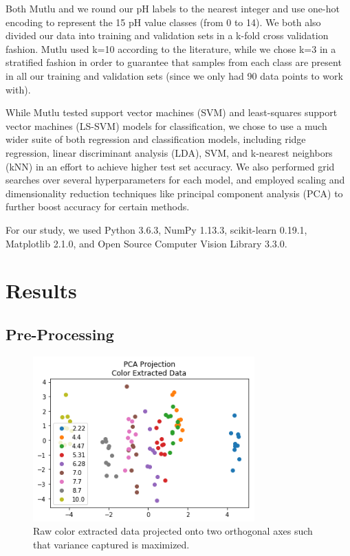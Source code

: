 \documentclass[journal]{IEEEtran}
\begin{document}
Both Mutlu and we round our pH labels to the nearest integer and use one-hot encoding to represent the 15 pH value classes (from 0 to 14). We both also divided our data into training and validation sets in a k-fold cross validation fashion. Mutlu used k=10 according to the literature, while we chose k=3 in a stratified fashion in order to guarantee that samples from each class are present in all our training and validation sets (since we only had 90 data points to work with).

While Mutlu tested support vector machines (SVM) and least-squares support vector machines (LS-SVM) models for classification, we chose to use a much wider suite of both regression and classification models, including ridge regression, linear discriminant analysis (LDA), SVM, and k-nearest neighbors (kNN) in an effort to achieve higher test set accuracy. We also performed grid searches over several hyperparameters for each model, and employed scaling and dimensionality reduction techniques like principal component analysis (PCA) to further boost accuracy for certain methods.

For our study, we used Python 3.6.3, NumPy 1.13.3, scikit-learn 0.19.1, Matplotlib 2.1.0, and Open Source Computer Vision Library 3.3.0.

\section{Results}

\subsection{Pre-Processing}
\begin{figure}
\centering
\includegraphics[height=2.5in]{pca.png}
\caption{Raw color extracted data projected onto two orthogonal axes such that variance captured is maximized.}
\label{pca}
\end{figure}
\end{document}
